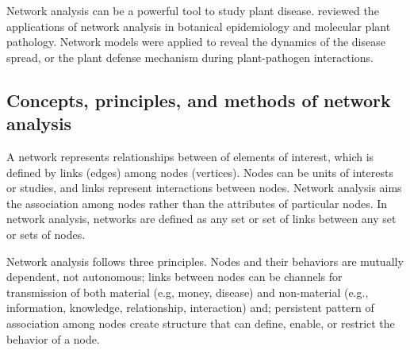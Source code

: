 Network analysis can be a powerful tool to study plant disease.  reviewed the applications of network analysis in botanical epidemiology and molecular plant pathology. Network models were applied to reveal the dynamics of the disease spread, or the plant defense mechanism during plant-pathogen interactions.

\subsection*{Concepts, principles, and methods of network analysis}

A network represents relationships between of elements of interest, which is defined by links (edges) among nodes (vertices). Nodes can be units of interests or studies, and links represent interactions between nodes. Network analysis aims the association among nodes rather than the attributes of particular nodes. In network analysis, networks are defined as any set or set of links between any set or sets of nodes.

Network analysis follows three principles. Nodes and their behaviors are mutually dependent, not autonomous; links between nodes can be channels for transmission of both material (e.g, money, disease) and non-material (e.g., information, knowledge, relationship, interaction) and; persistent pattern of association among nodes create structure that can define, enable, or restrict the behavior of a node.  

